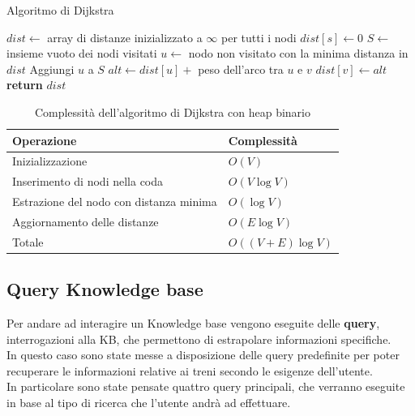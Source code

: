 \documentclass[italian,12pt,a4paper]{article}
\begin{document}
					\begin{algorithm}[h]
						\caption{Algoritmo di Dijkstra}
						\begin{algorithmic}[1]
							\State $dist \gets$ array di distanze inizializzato a $\infty$ per tutti i nodi
							\State $dist[s] \gets 0$
							\State $S \gets$ insieme vuoto dei nodi visitati
							\State $u \gets$ nodo non visitato con la minima distanza in $dist$
							\State Aggiungi $u$ a $S$
							\State $alt \gets dist[u] +$ peso dell'arco tra $u$ e $v$
							\State $dist[v] \gets alt$
							\EndIf
							\EndFor
							\EndWhile
							\State \textbf{return} $dist$ 
							\EndProcedure
						\end{algorithmic}
					\end{algorithm}
					\vspace{200px}
					
					\begin{table}[h]
						\centering
						\begin{tabular}{|l|l|}
							\hline
							\textbf{Operazione} & \textbf{Complessità} \\ \hline
							Inizializzazione & $O(V)$ \\ \hline
							Inserimento di nodi nella coda & $O(V \log V)$ \\ \hline
							Estrazione del nodo con distanza minima & $O(\log V)$ \\ \hline
							Aggiornamento delle distanze & $O(E \log V)$ \\ \hline
							Totale & $O((V + E) \log V)$ \\ \hline
						\end{tabular}
						\caption{Complessità dell'algoritmo di Dijkstra con heap binario}
					\end{table}
	
	\vspace{20px}

			\subsection{Query Knowledge base}
				Per andare ad interagire un Knowledge base vengono eseguite delle \textbf{query}, interrogazioni alla KB, che permettono di estrapolare informazioni specifiche.\\
				In questo caso sono state messe a disposizione delle query predefinite per poter recuperare le informazioni relative ai treni secondo le esigenze dell'utente. \\
				In particolare sono state pensate quattro query principali, che verranno eseguite in base al tipo di ricerca che l'utente andrà ad effettuare.\\
				\linebreak
				\newpage
\end{document}
